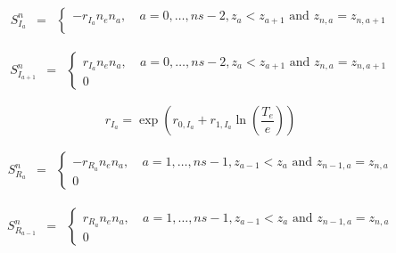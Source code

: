 \documentclass[a4paper,10pt]{report}
\begin{document}
\begin{equation}
\begin{matrix}
S_{I_a}^n & =
& \left\{
\begin{matrix}
-r_{I_a} n_e n_a, & \ a=0,\ldots,ns-2, z_a < z_{a+1} \mbox{ and } z_{n,a}=z_{n,a+1}\\

\end{matrix} \right.
\end{matrix}
\end{equation}

\begin{equation}
\begin{matrix}
S_{I_{a+1}}^n & =
& \left\{
\begin{matrix}
r_{I_a} n_e n_a, & \ a=0,\ldots,ns-2, z_a < z_{a+1} \mbox{ and } z_{n,a}=z_{n,a+1}\\
0
\end{matrix} \right.
\end{matrix}
\end{equation}

\begin{equation}
r_{I_a} = \exp \left( r_{0,I_a}+r_{1,I_a} \ln\left(\frac{T_e}e\right)\right)
\end{equation}

\begin{equation}
\begin{matrix}
S_{R_a}^n & =
& \left\{
\begin{matrix}
-r_{R_a} n_e n_a, & \ a=1,\ldots,ns-1, z_{a-1} < z_a \text{ and } z_{n-1,a}=z_{n,a}\\
0
\end{matrix} \right.
\end{matrix}
\end{equation}

\begin{equation}
\begin{matrix}
S_{R_{a-1}}^n & =
& \left\{
\begin{matrix}
r_{R_a} n_e n_a, & \ a=1,\ldots,ns-1, z_{a-1} < z_a \text{ and } z_{n-1,a}=z_{n,a}\\
0
\end{matrix} \right.
\end{matrix}
\end{equation}
\end{document}
